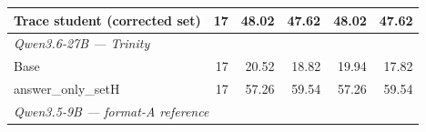 \begin{table}[t]
{\begin{tabular}{lrrrrr}
Trace student (corrected set) & 17 & 48.02 & 47.62 & 48.02 & 47.62 \\
\midrule
\multicolumn{6}{l}{\textit{Qwen3.6-27B --- Trinity}} \\
Base & 17 & 20.52 & 18.82 & 19.94 & 17.82 \\
answer\_only\_setH & 17 & 57.26 & 59.54 & 57.26 & 59.54 \\
\midrule
\multicolumn{6}{l}{\textit{Qwen3.5-9B --- format-A reference}} \\

\end{tabular}}
\end{table}
